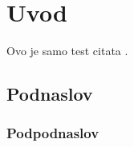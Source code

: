 \section{Uvod}

Ovo je samo test citata \cite{example}.

\subsection{Podnaslov}
\subsubsection{Podpodnaslov}
